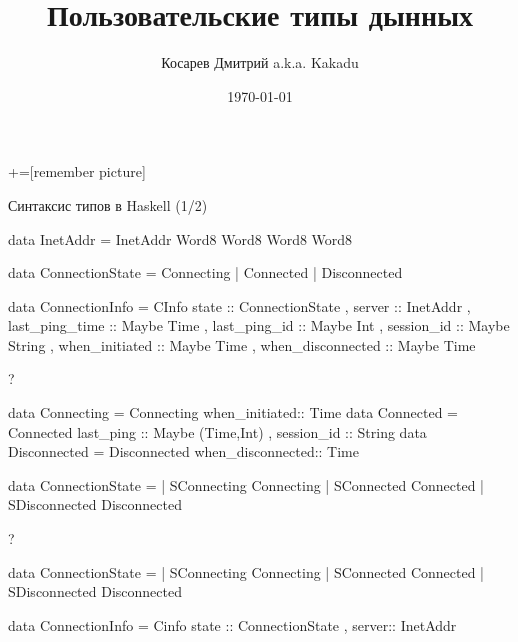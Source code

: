 \documentclass{beamer}
\title[Занятие 2]{Пользовательские типы дынных}
\author{Косарев Дмитрий a.k.a. Kakadu}
\institute{матмех СПбГУ}
\date{\today}
\begin{document}
\maketitle

+=[remember picture]

\everymath{\displaystyle}


\begin{frame}[fragile]{Синтаксис типов в Haskell (1/2)}
\begin{hslisting}
data InetAddr = InetAddr Word8 Word8 Word8 Word8

data ConnectionState = 
  Connecting  | Connected  | Disconnected 
  
data ConnectionInfo = CInfo 
  { state ::                   ConnectionState
  , server ::                  InetAddr
  , last_ping_time ::          Maybe Time
  , last_ping_id ::            Maybe Int
  , session_id ::              Maybe String
  , when_initiated ::          Maybe Time
  , when_disconnected ::       Maybe Time
  } 
\end{hslisting}
\end{frame}

\begin{frame}[fragile]{?}
\begin{hslisting}
data Connecting = 
  Connecting { when_initiated:: Time } 
data Connected  = Connected 
  { last_ping  :: Maybe (Time,Int)
  , session_id :: String   } 
data Disconnected = 
  Disconnected { when_disconnected:: Time } 
 
data ConnectionState = 
  | SConnecting   Connecting 
  | SConnected    Connected 
  | SDisconnected Disconnected 
\end{hslisting}
\end{frame}

\begin{frame}[fragile]{?}
\begin{hslisting}
data ConnectionState = 
  | SConnecting   Connecting 
  | SConnected    Connected 
  | SDisconnected Disconnected 
 
data ConnectionInfo = Cinfo 
  { state ::  ConnectionState
  , server:: InetAddr } 
\end{hslisting}
\end{frame}
\end{document}

